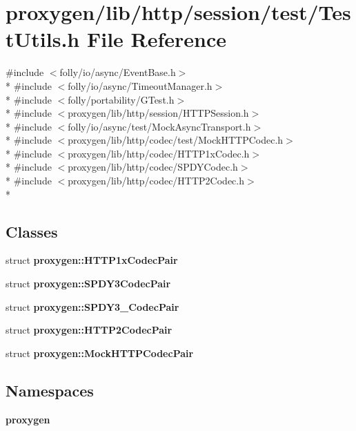 \section{proxygen/lib/http/session/test/\+Test\+Utils.h File Reference}
\label{http_2session_2test_2TestUtils_8h}
{\ttfamily \#include $<$folly/io/async/\+Event\+Base.\+h$>$}\\*
{\ttfamily \#include $<$folly/io/async/\+Timeout\+Manager.\+h$>$}\\*
{\ttfamily \#include $<$folly/portability/\+G\+Test.\+h$>$}\\*
{\ttfamily \#include $<$proxygen/lib/http/session/\+H\+T\+T\+P\+Session.\+h$>$}\\*
{\ttfamily \#include $<$folly/io/async/test/\+Mock\+Async\+Transport.\+h$>$}\\*
{\ttfamily \#include $<$proxygen/lib/http/codec/test/\+Mock\+H\+T\+T\+P\+Codec.\+h$>$}\\*
{\ttfamily \#include $<$proxygen/lib/http/codec/\+H\+T\+T\+P1x\+Codec.\+h$>$}\\*
{\ttfamily \#include $<$proxygen/lib/http/codec/\+S\+P\+D\+Y\+Codec.\+h$>$}\\*
{\ttfamily \#include $<$proxygen/lib/http/codec/\+H\+T\+T\+P2\+Codec.\+h$>$}\\*
\subsection*{Classes}
\begin{DoxyCompactItemize}
\item 
struct {\bf proxygen\+::\+H\+T\+T\+P1x\+Codec\+Pair}
\item 
struct {\bf proxygen\+::\+S\+P\+D\+Y3\+Codec\+Pair}
\item 
struct {\bf proxygen\+::\+S\+P\+D\+Y3\+\_\+Codec\+Pair}
\item 
struct {\bf proxygen\+::\+H\+T\+T\+P2\+Codec\+Pair}
\item 
struct {\bf proxygen\+::\+Mock\+H\+T\+T\+P\+Codec\+Pair}
\end{DoxyCompactItemize}
\subsection*{Namespaces}
\begin{DoxyCompactItemize}
\item 
 {\bf proxygen}
\end{DoxyCompactItemize}
